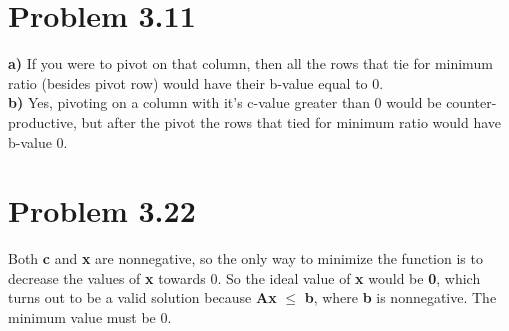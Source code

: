 \documentclass[a4paper,12pt]{article}
\begin{document}
\section*{Problem 3.11}
{\bf a)} If you were to pivot on that column, then all the rows that tie for minimum ratio (besides pivot row) would have their b-value
equal to 0. \\
{\bf b)} Yes, pivoting on a column with it's c-value greater than 0 would be counter-productive, but after the pivot the rows that 
tied for minimum ratio would have b-value 0.
\section*{Problem 3.22}
Both {\bf c} and {\bf x} are nonnegative, so the only way to minimize the function is to decrease the values of {\bf x} towards 0.
So the ideal value of {\bf x} would be {\bf 0}, which turns out to be a valid solution because {\bf Ax} \(\le\) {\bf b}, where {\bf b} is
nonnegative. The minimum value must be 0.
\end{document}
